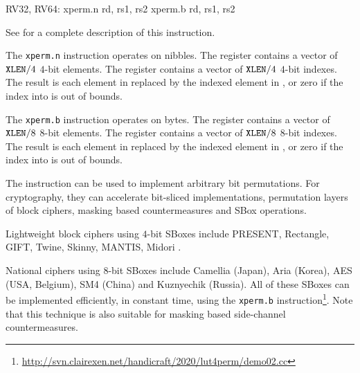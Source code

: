 \begin{cryptobitmanipisa}
RV32, RV64:
    xperm.n rd, rs1, rs2
    xperm.b rd, rs1, rs2
\end{cryptobitmanipisa}

See \cite[Section 2.2.4]{riscv:bitmanip:draft} for a complete
description of this instruction.

The {\tt xperm.n} instruction operates on nibbles.
The \rsone register contains a vector of ${\tt XLEN}/4$ $4$-bit elements.
The \rstwo register contains a vector of ${\tt XLEN}/4$ $4$-bit indexes.
The result is each element in \rstwo replaced by the indexed element
in \rsone, or zero if the index into \rstwo is out of bounds.

The {\tt xperm.b} instruction operates on bytes.
The \rsone register contains a vector of ${\tt XLEN}/8$ $8$-bit elements.
The \rstwo register contains a vector of ${\tt XLEN}/8$ $8$-bit indexes.
The result is each element in \rstwo replaced by the indexed element
in \rsone, or zero if the index into \rstwo is out of bounds.

The instruction can be used to implement arbitrary bit
permutations.
For cryptography, they can accelerate bit-sliced implementations,
permutation layers of block ciphers, masking based countermeasures
and SBox operations.

Lightweight block ciphers using $4$-bit SBoxes include
PRESENT\cite{block:present},
Rectangle\cite{block:rectangle},
GIFT\cite{block:gift},
Twine\cite{block:twine},
Skinny, MANTIS\cite{block:skinny},
Midori \cite{block:midori}.

National ciphers using $8$-bit SBoxes include
Camellia\cite{block:camellia} (Japan), 
Aria\cite{block:aria} (Korea),
AES\cite{nist:fips:197} (USA, Belgium),
SM4\cite{block:sm4:1} (China)
and Kuznyechik (Russia).
All of these SBoxes can be implemented efficiently, in constant
time, using the {\tt xperm.b} instruction\footnote{
    \url{http://svn.clairexen.net/handicraft/2020/lut4perm/demo02.cc}
}.
Note that this technique is also suitable for masking based
side-channel countermeasures.

%
